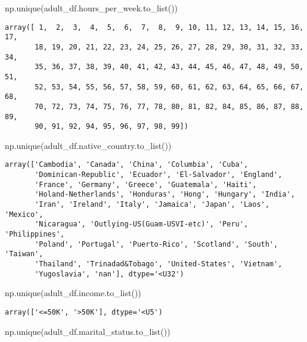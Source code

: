 \documentclass[
  letterpaper,
  DIV=11,
  numbers=noendperiod]{scrartcl}
\newenvironment{Shaded}{\begin{snugshade}}{\end{snugshade}}
\newcommand{\NormalTok}[1]{\textcolor[rgb]{0.00,0.23,0.31}{#1}}
\begin{document}
\begin{Shaded}
\begin{Highlighting}[]
\NormalTok{np.unique(adult\_df.hours\_per\_week.to\_list())}
\end{Highlighting}
\end{Shaded}

\begin{verbatim}
array([ 1,  2,  3,  4,  5,  6,  7,  8,  9, 10, 11, 12, 13, 14, 15, 16, 17,
       18, 19, 20, 21, 22, 23, 24, 25, 26, 27, 28, 29, 30, 31, 32, 33, 34,
       35, 36, 37, 38, 39, 40, 41, 42, 43, 44, 45, 46, 47, 48, 49, 50, 51,
       52, 53, 54, 55, 56, 57, 58, 59, 60, 61, 62, 63, 64, 65, 66, 67, 68,
       70, 72, 73, 74, 75, 76, 77, 78, 80, 81, 82, 84, 85, 86, 87, 88, 89,
       90, 91, 92, 94, 95, 96, 97, 98, 99])
\end{verbatim}

\begin{Shaded}
\begin{Highlighting}[]
\NormalTok{np.unique(adult\_df.native\_country.to\_list())}
\end{Highlighting}
\end{Shaded}

\begin{verbatim}
array(['Cambodia', 'Canada', 'China', 'Columbia', 'Cuba',
       'Dominican-Republic', 'Ecuador', 'El-Salvador', 'England',
       'France', 'Germany', 'Greece', 'Guatemala', 'Haiti',
       'Holand-Netherlands', 'Honduras', 'Hong', 'Hungary', 'India',
       'Iran', 'Ireland', 'Italy', 'Jamaica', 'Japan', 'Laos', 'Mexico',
       'Nicaragua', 'Outlying-US(Guam-USVI-etc)', 'Peru', 'Philippines',
       'Poland', 'Portugal', 'Puerto-Rico', 'Scotland', 'South', 'Taiwan',
       'Thailand', 'Trinadad&Tobago', 'United-States', 'Vietnam',
       'Yugoslavia', 'nan'], dtype='<U32')
\end{verbatim}

\begin{Shaded}
\begin{Highlighting}[]
\NormalTok{np.unique(adult\_df.income.to\_list())}
\end{Highlighting}
\end{Shaded}

\begin{verbatim}
array(['<=50K', '>50K'], dtype='<U5')
\end{verbatim}

\begin{Shaded}
\begin{Highlighting}[]
\NormalTok{np.unique(adult\_df.marital\_status.to\_list())}
\end{Highlighting}
\end{Shaded}
\end{document}
